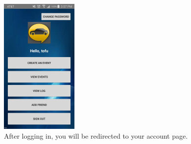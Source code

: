 \documentclass[12pt]{article}
\begin{document}
\begin{enumerate}
        \begin{figure}[H]
            \centering
            \includegraphics[width=1.5in]{account.jpg}
            \caption{After logging in, you will be redirected to your account page.}
            \label{account}
        \end{figure}
\end{enumerate}
\end{document}
